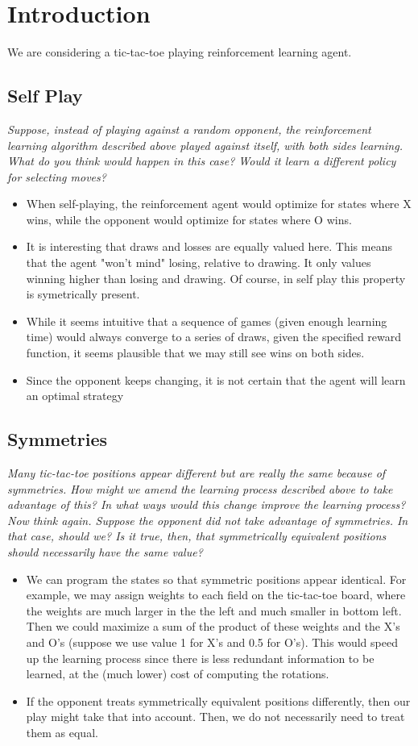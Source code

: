 \documentclass{article}
\begin{document}
\section{Introduction}
We are considering a tic-tac-toe playing reinforcement learning agent.
\subsection{Self Play}
\textit{Suppose, instead of playing against a random opponent, the reinforcement learning algorithm described above played against itself, with both sides learning. What do you think would happen in this case? Would it learn a different policy for selecting moves?}\\
\begin{itemize}
\item When self-playing, the reinforcement agent would optimize for states where X wins, while the opponent would optimize for states where O wins.
\item It is interesting that draws and losses are equally valued here. This means that the agent "won't mind" losing, relative to drawing. It only values winning higher than losing and drawing. Of course, in self play this property is symetrically present.
\item While it seems intuitive that a sequence of games (given enough learning time) would always converge to a series of draws, given the specified reward function, it seems plausible that we may still see wins on both sides.
\item Since the opponent keeps changing, it is not certain that the agent will learn an optimal strategy
\end{itemize}

\subsection{Symmetries}
\textit{Many tic-tac-toe positions appear different but are really the same because of symmetries. How might we amend the learning process described above to take advantage of this? In what ways would this change improve the learning process? Now think again. Suppose the opponent did not take advantage of symmetries. In that case, should we? Is it true, then, that symmetrically equivalent positions should necessarily have the same value?}
\begin{itemize}
\item We can program the states so that symmetric positions appear identical. For example, we may assign weights to each field on the tic-tac-toe board, where the weights are much larger in the the left and much smaller in bottom left. Then we could maximize a sum of the product of these weights and the X's and O's (suppose we use value 1 for X's and 0.5 for O's). This would speed up the learning process since there is less redundant information to be learned, at the (much lower) cost of computing the rotations.
\item If the opponent treats symmetrically equivalent positions differently, then our play might take that into account. Then, we do not necessarily need to treat them as equal.
\end{itemize}
\end{document}
